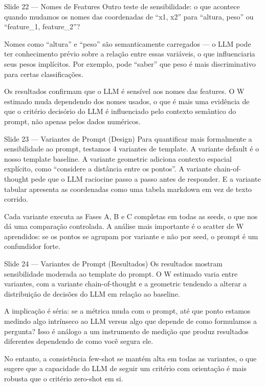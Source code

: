 \documentclass[aspectratio=169,11pt]{beamer}
\begin{document}
\begin{frame}{Slide 22 --- Nomes de Features}
\small
Outro teste de sensibilidade: o que acontece quando mudamos os nomes das coordenadas de ``x1, x2'' para ``altura, peso'' ou ``feature\_1, feature\_2''?

Nomes como ``altura'' e ``peso'' são semanticamente carregados --- o LLM pode ter conhecimento prévio sobre a relação entre essas variáveis, o que influenciaria seus pesos implícitos. Por exemplo, pode ``saber'' que peso é mais discriminativo para certas classificações.

Os resultados confirmam que o LLM é sensível aos nomes das features. O W estimado muda dependendo dos nomes usados, o que é mais uma evidência de que o critério decisório do LLM é influenciado pelo contexto semântico do prompt, não apenas pelos dados numéricos.
\end{frame}

\begin{frame}{Slide 23 --- Variantes de Prompt (Design)}
\small
Para quantificar mais formalmente a sensibilidade ao prompt, testamos 4 variantes de template. A variante default é o nosso template baseline. A variante geometric adiciona contexto espacial explícito, como ``considere a distância entre os pontos''. A variante chain-of-thought pede que o LLM raciocine passo a passo antes de responder. E a variante tabular apresenta as coordenadas como uma tabela markdown em vez de texto corrido.

Cada variante executa as Fases A, B e C completas em todas as seeds, o que nos dá uma comparação controlada. A análise mais importante é o scatter de W aprendidos: se os pontos se agrupam por variante e não por seed, o prompt é um confundidor forte.
\end{frame}

\begin{frame}{Slide 24 --- Variantes de Prompt (Resultados)}
\small
Os resultados mostram sensibilidade moderada ao template do prompt. O W estimado varia entre variantes, com a variante chain-of-thought e a geometric tendendo a alterar a distribuição de decisões do LLM em relação ao baseline.

A implicação é séria: se a métrica muda com o prompt, até que ponto estamos medindo algo intrínseco ao LLM versus algo que depende de como formulamos a pergunta? Isso é análogo a um instrumento de medição que produz resultados diferentes dependendo de como você segura ele.

No entanto, a consistência few-shot se mantém alta em todas as variantes, o que sugere que a capacidade do LLM de seguir um critério com orientação é mais robusta que o critério zero-shot em si.
\end{frame}
\end{document}
